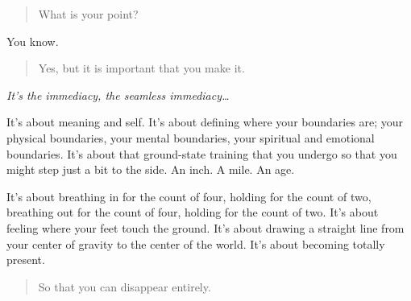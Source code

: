 \begin{quote}
What is your point?
\end{quote}

You know.

\begin{quote}
Yes, but it is important that you make it.
\end{quote}

\emph{It's the immediacy, the seamless immediacy\ldots{}}

It's about meaning and self. It's about defining where your boundaries are; your physical boundaries, your mental boundaries, your spiritual and emotional boundaries. It's about that ground-state training that you undergo so that you might step just a bit to the side. An inch. A mile. An age.

It's about breathing in for the count of four, holding for the count of two, breathing out for the count of four, holding for the count of two. It's about feeling where your feet touch the ground. It's about drawing a straight line from your center of gravity to the center of the world. It's about becoming totally present.

\begin{quote}
So that you can disappear entirely.
\end{quote}
